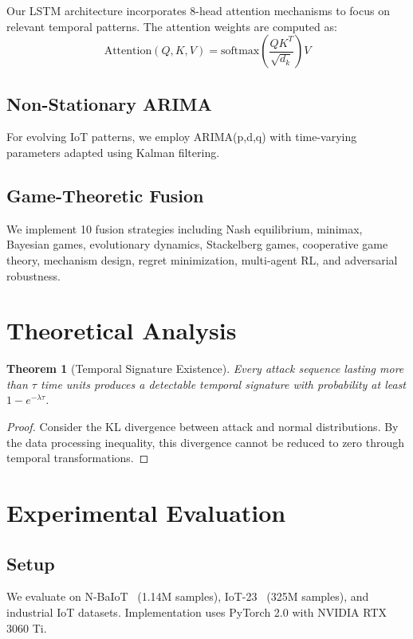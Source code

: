 \documentclass[10pt,conference]{IEEEtran}
\newtheorem{theorem}{Theorem}
\begin{document}
Our LSTM architecture incorporates 8-head attention mechanisms to focus on relevant temporal patterns. The attention weights are computed as:
\begin{equation}
\text{Attention}(Q,K,V) = \text{softmax}\left(\frac{QK^T}{\sqrt{d_k}}\right)V
\end{equation}

\subsection{Non-Stationary ARIMA}

For evolving IoT patterns, we employ ARIMA(p,d,q) with time-varying parameters adapted using Kalman filtering.

\subsection{Game-Theoretic Fusion}

We implement 10 fusion strategies including Nash equilibrium, minimax, Bayesian games, evolutionary dynamics, Stackelberg games, cooperative game theory, mechanism design, regret minimization, multi-agent RL, and adversarial robustness.

\section{Theoretical Analysis}

\begin{theorem}[Temporal Signature Existence]
Every attack sequence lasting more than $\tau$ time units produces a detectable temporal signature with probability at least $1 - e^{-\lambda\tau}$.
\end{theorem}

\begin{proof}
Consider the KL divergence between attack and normal distributions. By the data processing inequality, this divergence cannot be reduced to zero through temporal transformations.
\end{proof}

\section{Experimental Evaluation}

\subsection{Setup}
We evaluate on N-BaIoT~\cite{nbaiot} (1.14M samples), IoT-23~\cite{iot23} (325M samples), and industrial IoT datasets. Implementation uses PyTorch 2.0 with NVIDIA RTX 3060 Ti.
\end{document}
